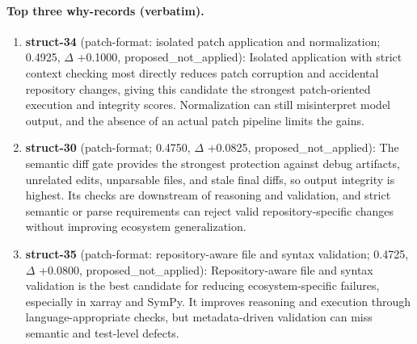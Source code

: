 \paragraph{Top three why-records (verbatim).}\begin{enumerate}\itemsep1pt
\item \textbf{struct-34} (patch-format: isolated patch application and normalization; 0.4925, $\Delta$ +0.1000, proposed\_not\_applied): Isolated application with strict context checking most directly reduces patch corruption and accidental repository changes, giving this candidate the strongest patch-oriented execution and integrity scores. Normalization can still misinterpret model output, and the absence of an actual patch pipeline limits the gains.
\item \textbf{struct-30} (patch-format; 0.4750, $\Delta$ +0.0825, proposed\_not\_applied): The semantic diff gate provides the strongest protection against debug artifacts, unrelated edits, unparsable files, and stale final diffs, so output integrity is highest. Its checks are downstream of reasoning and validation, and strict semantic or parse requirements can reject valid repository-specific changes without improving ecosystem generalization.
\item \textbf{struct-35} (patch-format: repository-aware file and syntax validation; 0.4725, $\Delta$ +0.0800, proposed\_not\_applied): Repository-aware file and syntax validation is the best candidate for reducing ecosystem-specific failures, especially in xarray and SymPy. It improves reasoning and execution through language-appropriate checks, but metadata-driven validation can miss semantic and test-level defects.
\end{enumerate}
